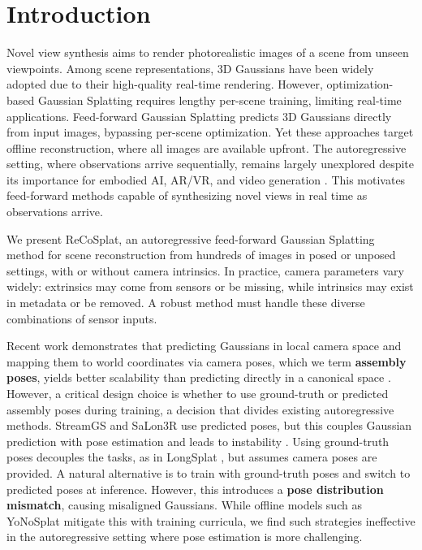 \documentclass[runningheads]{llncs}
\begin{document}
\section{Introduction}
\label{sec:intro}

Novel view synthesis aims to render photorealistic images of a scene from unseen viewpoints. 
Among scene representations, 3D Gaussians have been widely adopted due to their high-quality real-time rendering. 
However, optimization-based Gaussian Splatting \cite{kerbl3Dgaussians} requires lengthy per-scene training, limiting real-time applications. 
Feed-forward Gaussian Splatting \cite{charatan23pixelsplat, szymanowicz24splatter, gslrm2024, ye2025no, jiang2025anysplat, xu2024depthsplat, ye2025yonosplatneedmodelfeedforward} predicts 3D Gaussians directly from input images, bypassing per-scene optimization. 
Yet these approaches target offline reconstruction, where all images are available upfront. 
The autoregressive setting, where observations arrive sequentially, remains largely unexplored despite its importance for embodied AI, AR/VR, and video generation \cite{chen2026contextforcingconsistentautoregressive, wu2025video}. 
This motivates feed-forward methods capable of synthesizing novel views in real time as observations arrive.

We present ReCoSplat, an autoregressive feed-forward Gaussian Splatting method for scene reconstruction from hundreds of images in posed or unposed settings, with or without camera intrinsics. 
In practice, camera parameters vary widely: extrinsics may come from sensors or be missing, while intrinsics may exist in metadata or be removed. 
A robust method must handle these diverse combinations of sensor inputs.

Recent work demonstrates that predicting Gaussians in local camera space and mapping them to world coordinates via camera poses, which we term \textbf{assembly poses}, yields better scalability than predicting directly in a canonical space \cite{ye2025no, ye2025yonosplatneedmodelfeedforward}. However, a critical design choice is whether to use ground-truth or predicted assembly poses during training, a decision that divides existing autoregressive methods.
StreamGS \cite{StreamGS} and SaLon3R \cite{SaLon3R} use predicted poses, but this couples Gaussian prediction with pose estimation and leads to instability \cite{ye2025yonosplatneedmodelfeedforward}. 
Using ground-truth poses decouples the tasks, as in LongSplat \cite{huang2025longsplatonlinegeneralizable3d}, but assumes camera poses are provided.
A natural alternative is to train with ground-truth poses and switch to predicted poses at inference. 
However, this introduces a \textbf{pose distribution mismatch}, causing misaligned Gaussians. 
While offline models such as YoNoSplat \cite{ye2025yonosplatneedmodelfeedforward} mitigate this with training curricula, we find such strategies ineffective in the autoregressive setting where pose estimation is more challenging.
\end{document}
